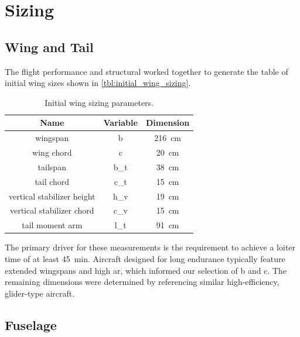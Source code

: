 \chapter{Sizing}\label{cp:sizing}

\section{Wing and Tail}

The flight performance and structural worked together to generate the table of initial wing sizes shown in \autoref{tbl:initial_wing_sizing}.

\begin{table}[htpb]
    \centering
    \caption[Initial wing sizing]{Initial wing sizing parameters.}
    \begin{tabular}{ccc}
        \toprule
        \textbf{Name} & \textbf{Variable} & \textbf{Dimension} \\
        \midrule
        wingspan & \gls{b} & \qty{216}{\centi\meter} \\
        wing chord & \gls{c} & \qty{20}{\centi\meter} \\
        tailspan & \gls{b_t} & \qty{38}{\centi\meter} \\
        tail chord & \gls{c_t} & \qty{15}{\centi\meter} \\
        vertical stabilizer height & \gls{h_v} & \qty{19}{\centi\meter} \\
        vertical stabilizer chord & \gls{c_v} & \qty{15}{\centi\meter} \\
        tail moment arm & \gls{l_t} & \qty{91}{\centi\meter} \\
        \bottomrule
    \end{tabular}
    \label{tbl:initial_wing_sizing}
\end{table}

The primary driver for these measurements is the requirement to achieve a loiter time of at least \qty{45}{\minute}. Aircraft designed for long endurance typically feature extended wingspans and high \acrshort{ar}, which informed our selection of \gls{b} and \gls{c}. The remaining dimensions were determined by referencing similar high-efficiency, glider-type aircraft.

\newpage

\section {Fuselage}

